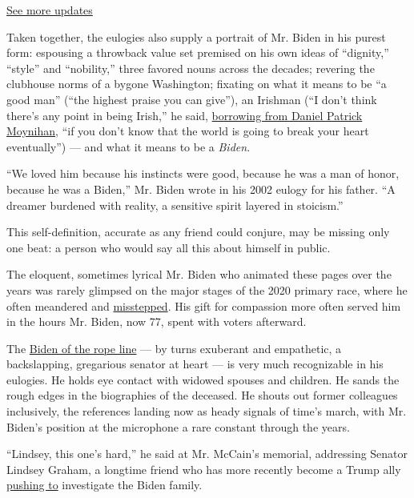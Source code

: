 \href{https://www.nytimes.com/2020/07/31/us/elections/biden-vs-trump.html?action=click\&pgtype=Article\&state=default\&region=MAIN_CONTENT_1\&context=storylines_live_updates}{See
more updates}

Taken together, the eulogies also supply a portrait of Mr. Biden in his
purest form: espousing a throwback value set premised on his own ideas
of ``dignity,'' ``style'' and ``nobility,'' three favored nouns across
the decades; revering the clubhouse norms of a bygone Washington;
fixating on what it means to be ``a good man'' (``the highest praise you
can give''), an Irishman (``I don't think there's any point in being
Irish,'' he said,
\href{https://www.nytimes.com/2003/03/26/obituaries/former-senator-daniel-patrick-moynihan-dead-at-76.html}{borrowing
from Daniel Patrick Moynihan}, ``if you don't know that the world is
going to break your heart eventually'') --- and what it means to be a
\emph{Biden}.

``We loved him because his instincts were good, because he was a man of
honor, because he was a Biden,'' Mr. Biden wrote in his 2002 eulogy for
his father. ``A dreamer burdened with reality, a sensitive spirit
layered in stoicism.''

This self-definition, accurate as any friend could conjure, may be
missing only one beat: a person who would say all this about himself in
public.

The eloquent, sometimes lyrical Mr. Biden who animated these pages over
the years was rarely glimpsed on the major stages of the 2020 primary
race, where he often meandered and
\href{https://www.nytimes.com/2020/02/21/us/politics/biden-south-africa-arrest-mandela.html}{misstepped}.
His gift for compassion more often served him in the hours Mr. Biden,
now 77, spent with voters afterward.

The
\href{https://www.nytimes.com/2019/05/15/us/politics/biden-new-hampshire-2020.html}{Biden
of the rope line} --- by turns exuberant and empathetic, a backslapping,
gregarious senator at heart --- is very much recognizable in his
eulogies. He holds eye contact with widowed spouses and children. He
sands the rough edges in the biographies of the deceased. He shouts out
former colleagues inclusively, the references landing now as heady
signals of time's march, with Mr. Biden's position at the microphone a
rare constant through the years.

``Lindsey, this one's hard,'' he said at Mr. McCain's memorial,
addressing Senator Lindsey Graham, a longtime friend who has more
recently become a Trump ally
\href{https://www.nytimes.com/2019/12/06/us/politics/joe-biden-trump-ukraine.html}{pushing
to} investigate the Biden family.

